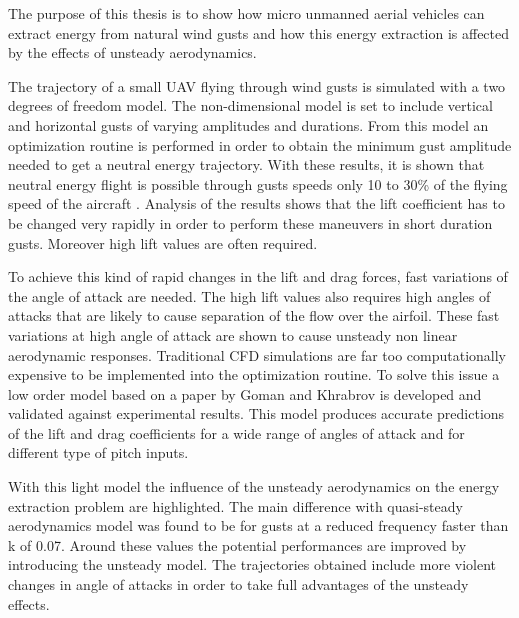 \par The purpose of this thesis is to show how micro unmanned aerial vehicles can extract energy from natural wind gusts and how this energy extraction is affected by the effects of unsteady aerodynamics.

\par The trajectory of a small UAV flying through wind gusts is simulated with a two degrees of freedom model.
The non-dimensional model is set to include vertical and horizontal gusts of varying amplitudes and durations.
From this model an optimization routine is performed in order to obtain the minimum gust amplitude needed to get a neutral energy trajectory.
With these results, it is shown that neutral energy flight is possible through gusts speeds only 10 to 30\% of the flying speed of the aircraft .
Analysis of the results shows that the lift coefficient has to be changed very rapidly in order to perform these maneuvers in short duration gusts. 
Moreover high lift values are often required. 

\par To achieve this kind of rapid changes in the lift and drag forces, fast variations of the angle of attack are needed.
The high lift values also requires high angles of attacks that are likely to cause separation of the flow over the airfoil.
These fast variations at high angle of attack are shown to cause unsteady non linear aerodynamic responses.
Traditional CFD simulations are far too computationally expensive to be implemented into the optimization routine.
To solve this issue a low order model based on a paper by Goman and Khrabrov \cite{GK} is developed and validated against experimental results.
This model produces accurate predictions of the lift and drag coefficients for a wide range of angles of attack and for different type of pitch inputs.

\par With this light model the influence of the unsteady aerodynamics on the energy extraction problem are highlighted.
The main difference with quasi-steady aerodynamics model was found to be for gusts at a reduced frequency faster than k of 0.07.
Around these values the potential performances are improved by introducing the unsteady model.
The trajectories obtained include more violent changes in angle of attacks in order to take full advantages of the unsteady effects.


